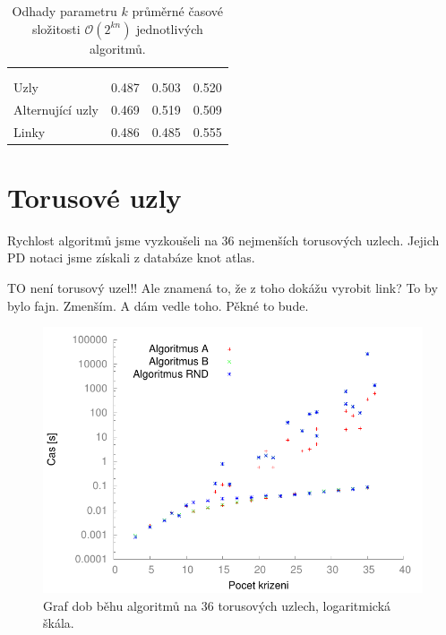 \begin{table}[b!]

\centering

\begin{tabular}{l@{\hspace{1.5cm}}D{.}{,}{3}D{.}{,}{1.3}D{.}{,}{2.4}} 
\toprule
 & \mc{} & \mc{} & \mc{} \\
\mc{} &  &  &
 \\
\midrule
Uzly     & 0.487 & 0.503& 0.520 \\
Alternující uzly & 0.469 & 0.519 & 0.509 \\
Linky   & 0.486 & 0.485 &  0.555\\
\bottomrule
\end{tabular}

\caption{Odhady parametru $k$ průměrné časové složitosti $\mathcal{O}(2^{kn})$ jednotlivých algoritmů.}\label{tab03:algo}

\end{table}


\section{Torusové uzly}
Rychlost algoritmů jsme vyzkoušeli na 36 nejmenších torusových uzlech. Jejich PD notaci jsme získali z databáze knot atlas.

TO není torusový uzel!! Ale znamená to, že z toho dokážu vyrobit link? To by bylo fajn. Zmenším. A dám vedle toho. Pěkné to bude.

\begin{figure}[p]\centering
\includegraphics{../img/torusSrov}
\caption{Graf dob běhu algoritmů na 36 torusových uzlech, logaritmická škála.}
\label{obr03:torusSrov}
\end{figure}

